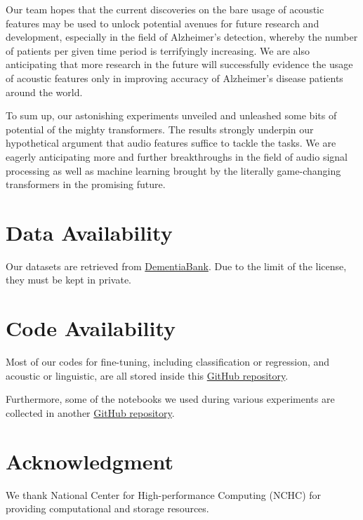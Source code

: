 \documentclass[journal]{IEEEtran}
\begin{document}
Our team hopes that the current discoveries on the bare usage of acoustic features may be used to unlock potential avenues for future research and development, especially in the field of Alzheimer’s detection, whereby the number of patients per given time period is terrifyingly increasing. We are also anticipating that more research in the future will successfully evidence the usage of acoustic features only in improving accuracy of Alzheimer’s disease patients around the world.

To sum up, our astonishing experiments unveiled and unleashed some bits of potential of the mighty transformers. The results strongly underpin our hypothetical argument that audio features suffice to tackle the tasks. We are eagerly anticipating more and further breakthroughs in the field of audio signal processing as well as machine learning brought by the literally game-changing transformers in the promising future.


\newpage

\appendices

\section{Data Availability}

Our datasets are retrieved from \href{https://dementia.talkbank.org/ADReSSo-2021/}{DementiaBank}. Due to the limit of the license, they must be kept in private.

\section{Code Availability}

Most of our codes for fine-tuning, including classification or regression, and acoustic or linguistic, are all stored inside this \href{https://github.com/NTHU-ML-2023-team19/ADReSSo}{GitHub repository}.

Furthermore, some of the notebooks we used during various experiments are collected in another \href{https://github.com/NTHU-ML-2023-team19/ADReSSo-Notebooks}{GitHub repository}.

\section*{Acknowledgment}

We thank National Center for High-performance Computing (NCHC) for providing computational and storage resources.
\end{document}
